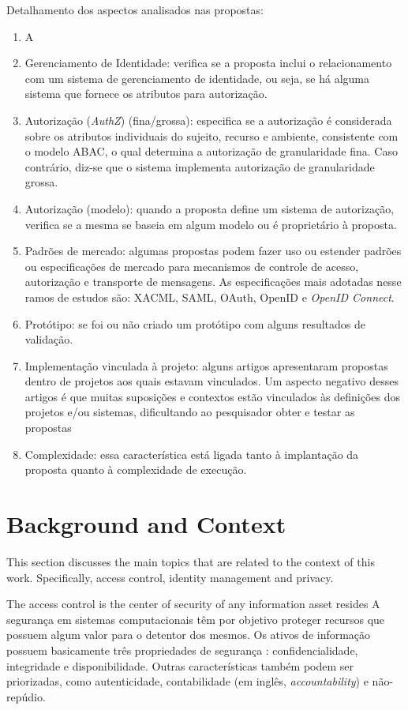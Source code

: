 \documentclass{doublecol-new}
\begin{document}
Detalhamento dos aspectos analisados nas propostas:
\begin{enumerate}
	\item A
	\item Gerenciamento de Identidade: verifica se a proposta inclui o relacionamento com um sistema de gerenciamento de identidade, ou seja, se há alguma sistema que fornece os atributos para autorização.
	\item Autorização (\textit{AuthZ}) (fina/grossa): especifica se a autorização é considerada sobre os atributos individuais do sujeito, recurso e ambiente, consistente com o modelo ABAC, o qual determina a autorização de granularidade fina. Caso contrário, diz-se que o sistema implementa autorização de granularidade grossa.
	\item Autorização (modelo): quando a proposta define um sistema de autorização, verifica se a mesma se baseia em algum modelo ou é proprietário à proposta.
	\item Padrões de mercado: algumas propostas podem fazer uso ou estender padrões ou especificações de mercado para mecanismos de controle de acesso, autorização e transporte de mensagens. As especificações mais adotadas nesse ramos de estudos são: XACML, SAML, OAuth, OpenID e \textit{OpenID Connect}.
	\item Protótipo: se foi ou não criado um protótipo com alguns resultados de validação.
	\item Implementação vinculada à projeto: alguns artigos apresentaram propostas dentro de projetos aos quais estavam vinculados. Um aspecto negativo desses artigos é que muitas suposições e contextos estão vinculados às definições dos projetos e/ou sistemas, dificultando ao pesquisador obter e testar as propostas
	\item Complexidade: essa característica está ligada tanto à implantação da proposta quanto à complexidade de execução.
\end{enumerate}


\section{Background and Context}
This section discusses the main topics that are related to the context of this work. Specifically, access control, identity management and privacy.

The access control is the center of security of any information asset resides A segurança em sistemas computacionais têm por objetivo proteger recursos que possuem algum valor para o detentor dos mesmos. Os ativos de informação possuem basicamente três propriedades de segurança \cite{gollmann2011compsecurity}: confidencialidade, integridade e disponibilidade. Outras características também podem ser priorizadas, como autenticidade, contabilidade (em inglês, \textit{accountability}) e não-repúdio. 
\end{document}
